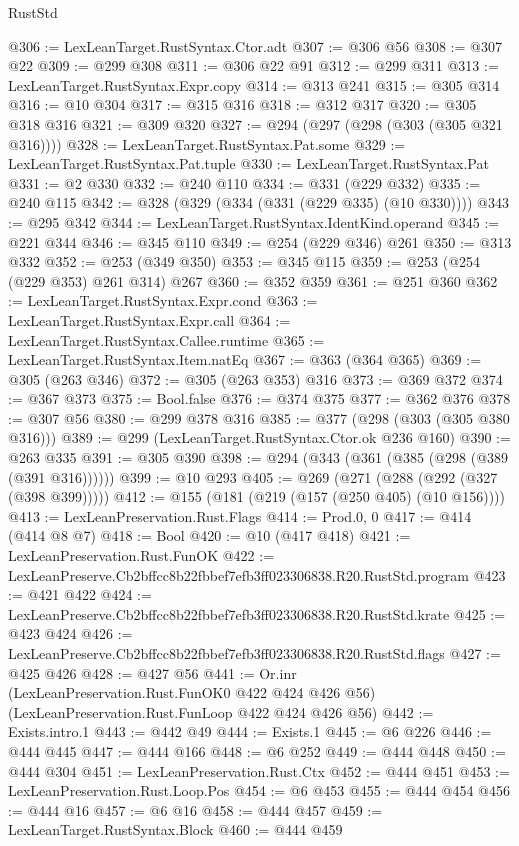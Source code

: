 \begin{lexlean}{RustStd}
\begin{coremodule}
@306 := LexLeanTarget.RustSyntax.Ctor.adt
@307 := @306 @56
@308 := @307 @22
@309 := @299 @308
@311 := @306 @22 @91
@312 := @299 @311
@313 := LexLeanTarget.RustSyntax.Expr.copy
@314 := @313 @241
@315 := @305 @314
@316 := @10 @304
@317 := @315 @316
@318 := @312 @317
@320 := @305 @318 @316
@321 := @309 @320
@327 := @294 (@297 (@298 (@303 (@305 @321 @316))))
@328 := LexLeanTarget.RustSyntax.Pat.some
@329 := LexLeanTarget.RustSyntax.Pat.tuple
@330 := LexLeanTarget.RustSyntax.Pat
@331 := @2 @330
@332 := @240 @110
@334 := @331 (@229 @332)
@335 := @240 @115
@342 := @328 (@329 (@334 (@331 (@229 @335) (@10 @330))))
@343 := @295 @342
@344 := LexLeanTarget.RustSyntax.IdentKind.operand
@345 := @221 @344
@346 := @345 @110
@349 := @254 (@229 @346) @261
@350 := @313 @332
@352 := @253 (@349 @350)
@353 := @345 @115
@359 := @253 (@254 (@229 @353) @261 @314) @267
@360 := @352 @359
@361 := @251 @360
@362 := LexLeanTarget.RustSyntax.Expr.cond
@363 := LexLeanTarget.RustSyntax.Expr.call
@364 := LexLeanTarget.RustSyntax.Callee.runtime
@365 := LexLeanTarget.RustSyntax.Item.natEq
@367 := @363 (@364 @365)
@369 := @305 (@263 @346)
@372 := @305 (@263 @353) @316
@373 := @369 @372
@374 := @367 @373
@375 := Bool.false
@376 := @374 @375
@377 := @362 @376
@378 := @307 @56
@380 := @299 @378 @316
@385 := @377 (@298 (@303 (@305 @380 @316)))
@389 := @299 (LexLeanTarget.RustSyntax.Ctor.ok @236 @160)
@390 := @263 @335
@391 := @305 @390
@398 := @294 (@343 (@361 (@385 (@298 (@389 (@391 @316))))))
@399 := @10 @293
@405 := @269 (@271 (@288 (@292 (@327 (@398 @399)))))
@412 := @155 (@181 (@219 (@157 (@250 @405) (@10 @156))))
@413 := LexLeanPreservation.Rust.Flags
@414 := Prod.{0, 0}
@417 := @414 (@414 @8 @7)
@418 := Bool
@420 := @10 (@417 @418)
@421 := LexLeanPreservation.Rust.FunOK
@422 := LexLeanPreserve.Cb2bffcc8b22fbbef7efb3ff023306838.R20.RustStd.program
@423 := @421 @422
@424 := LexLeanPreserve.Cb2bffcc8b22fbbef7efb3ff023306838.R20.RustStd.krate
@425 := @423 @424
@426 := LexLeanPreserve.Cb2bffcc8b22fbbef7efb3ff023306838.R20.RustStd.flags
@427 := @425 @426
@428 := @427 @56
@441 := Or.inr
    (LexLeanPreservation.Rust.FunOK0 @422 @424 @426 @56)
    (LexLeanPreservation.Rust.FunLoop @422 @424 @426 @56)
@442 := Exists.intro.{1}
@443 := @442 @49
@444 := Exists.{1}
@445 := @6 @226
@446 := @444 @445
@447 := @444 @166
@448 := @6 @252
@449 := @444 @448
@450 := @444 @304
@451 := LexLeanPreservation.Rust.Ctx
@452 := @444 @451
@453 := LexLeanPreservation.Rust.Loop.Pos
@454 := @6 @453
@455 := @444 @454
@456 := @444 @16
@457 := @6 @16
@458 := @444 @457
@459 := LexLeanTarget.RustSyntax.Block
@460 := @444 @459

\end{coremodule}
\end{lexlean}
